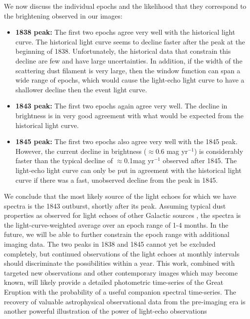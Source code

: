 We now discuss the individual epochs and the likelihood that they
correspond to the brightening observed in our images:
\begin{itemize}
\item {\bf 1838 peak:}
The first two epochs agree very well with the historical light curve.
The historical light curve seems to decline faster after the peak at
the beginning of 1838. Unfortunately, the historical data that
constrain this decline are few and have large uncertainties. In
addition, if the width of the scattering dust filament is very large,
then the window function can span a wide range of epochs, which would
cause the light-echo light curve to have a shallower decline then the
event light curve.
\item {\bf 1843 peak:}
The first two epochs again agree very well. The decline in brightness
is in very good agreement with what would be expected from the
historical light curve.
\item {\bf 1845 peak:}
The first two epochs also agree very well with the 1845 peak.
However, the current decline in brightness ($\approx$0.6 mag
yr$^{-1}$) is considerably faster than the typical decline of
$\approx$0.1mag yr$^{-1}$ observed after 1845. The light-echo light
curve can only be put in agreement with the historical light curve if
there was a fast, unobserved decline from the peak in 1845.
\end{itemize}

We conclude that the most likely source of the light echoes for which
we have spectra is the 1843 outburst, shortly after its peak.
Assuming typical dust properties as observed for light echoes of other
Galactic sources \cite{Rest11_leprofile}, the spectra is the
light-curve-weighted average over an epoch range of 1-4 months.  In
the future, we will be able to further constrain the epoch range with
additional imaging data.  The two peaks in 1838 and 1845 cannot yet be
excluded completely, but continued observations of the light echoes at
monthly intervals should discriminate the possibilities within a year.
This work, combined with targeted new observations and other
contemporary images which may become known, will likely provide a
detailed photometric time-series of the Great Eruption with the
probability of a useful companion spectral time-series.  The recovery
of valuable astrophysical observational data from the pre-imaging era
is another powerful illustration of the power of light-echo
observations

\clearpage



  


